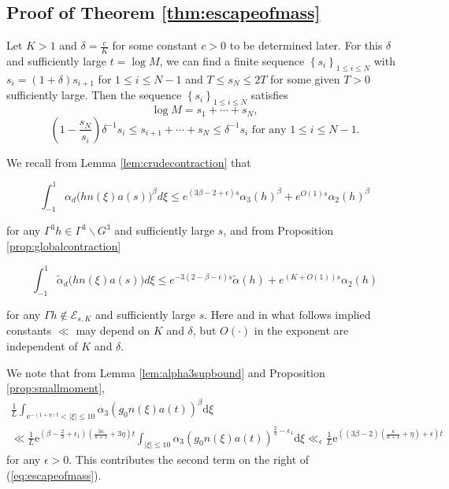 \documentclass[12pt]{amsart}
\theoremstyle{definition}
\theoremstyle{remark}
\numberwithin{equation}{section}
\newcommand{\dd}{\mathrm{d}}
\newcommand{\e}{\mathrm{e}}
\newcommand{\del}{\delta}
\newcommand{\cE}{\mathcal{E}}
\newcommand\set[1]{\left\{#1\right\}}
\newcommand{\eqlabel}[2]
{
\begin{equation}
{#2}\label{#1}
\end{equation}
}
\begin{document}
\subsection{Proof of Theorem \ref{thm:escapeofmass}}
\label{sec:propproof}

Let $K>1$ and $\delta=\frac{c}{K}$ for some constant $c>0$ to be determined later. For this $\delta$ and sufficiently large $t=\log M$, we can find a finite sequence $\set{s_i}_{1\leq i\leq N}$ with $s_i=(1+\delta)s_{i+1}$ for $1\leq i\leq N-1$ and $T\leq s_N\leq 2T$ for some given $T>0$ sufficiently large. Then the sequence $\set{s_i}_{1\leq i\leq N}$ satisfies
        \begin{equation}
        \label{eq:sibound}
        \log M=s_1+\cdots+s_N, %
    \end{equation}
    \begin{equation}
      \label{eq:sumratio}
      \left(1-\frac{s_N}{s_i}\right)\del^{-1}s_i\leq s_{i+1}+\cdots+s_N\leq \del^{-1}s_i 
      \textrm{ for any }1\leq i\leq N-1.
  \end{equation}
    
We recall from Lemma \ref{lem:crudecontraction} that
    \eqlabel{eq:recalltrivialcontraction}{
        \int_{-1}^{1}\alpha_d\big(hn(\xi)a(s)\big)^{\beta}d\xi\leq  e^{(3\beta-2 + \epsilon ) s}\alpha_3(h)^{\beta}+e^{O(1)s}\alpha_{2}(h)^{\beta}}
    for any $\Gamma^3 h\in \Gamma^3\backslash G^3$ and sufficiently large $s$, and from Proposition \ref{prop:globalcontraction}
    \eqlabel{eq:recallnontrivialcontraction}{
        \int_{-1}^{1}\widetilde{\alpha}_d\big(hn(\xi)a(s)\big)d\xi\leq e^{-3(2-\beta - \epsilon) s}\widetilde{\alpha}(h)+e^{(K+O(1))s}\alpha_{2}(h)}
      for any $\Gamma h\notin\cE_{s,K}$ and sufficiently large $s$.
      Here and in what follows implied constants $\ll$ may depend on $K$ and $\delta$, but $O(\cdot)$ in the exponent are independent of $K$ and $\delta$.

      We note that from Lemma \ref{lem:alpha3supbound} and Proposition \ref{prop:smallmoment},
\begin{multline}
  \label{eq:boundedxi}
  \tfrac{1}{L} \int_{\e^{-(1 + \eta)t} < |\xi| \leq 10} \alpha_3(g_0 n(\xi)a(t))^\beta \dd \xi \\
  \ll \tfrac{1}{L} \e^{(\beta - \frac{2}{3} + \epsilon_1) (\frac{3\kappa}{\kappa + 1} + 3\eta)t} \int_{|\xi| \leq 10} \alpha_3(g_0 n(\xi)a(t))^{\frac{2}{3} - \epsilon_1} \dd \xi \ll_\epsilon \tfrac{1}{L} \e^{((3\beta - 2)(\frac{\kappa}{\kappa + 1} + \eta) + \epsilon)t}
\end{multline}
for any $\epsilon > 0$.
This contributes the second term on the right of (\ref{eq:escapeofmass}).
\end{document}
